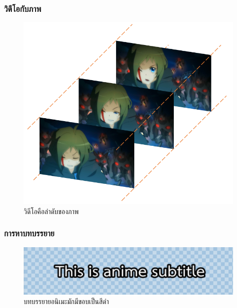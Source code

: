 \documentclass[xcolor=dvipsnames, xetex,serif]{beamer}
\numberwithin{equation}{section}
\begin{document}
    \begin{frame}
    \frametitle{วิดีโอกับภาพ}
        \begin{figure}[H]
            \centering
            \includegraphics[width=0.6\linewidth]{images/anime-frame.png}
            \caption{วิดีโอคือลำดับของภาพ}
        \end{figure}
    \end{frame}
    \begin{frame}
        \frametitle{การหาบทบรรยาย}
        \begin{figure}[H]
            \centering
            \includegraphics[width=0.8\linewidth]{images/subtitle-remove/thisisanimesubtitle.png}
            \caption{บทบรรยายอนิเมะมักมีขอบเป็นสีดำ}
        \end{figure}
    \end{frame}
\end{document}
